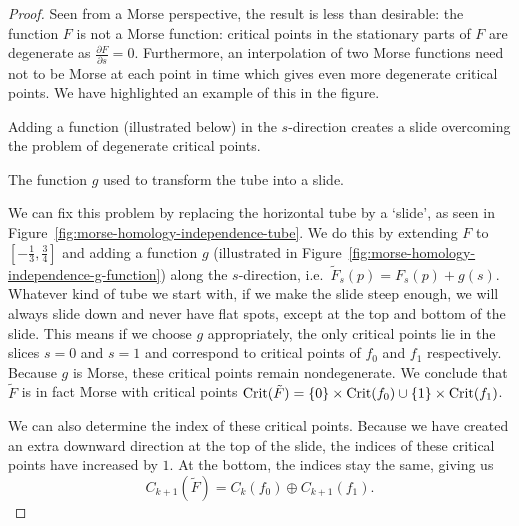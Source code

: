 \begin{proof}
Seen from a Morse perspective, the result is less than desirable: the function $F$ is not a Morse function: critical points in the stationary parts of $F$ are degenerate as $\frac{\partial F}{\partial s} = 0$.
Furthermore, an interpolation of two Morse functions need not to be Morse at each point in time which gives even more degenerate critical points. We have highlighted an example of this in the figure.

\begin{marginfigure}
    \centering
    \caption{Adding a function (illustrated below) in the $s$-direction creates a slide overcoming the problem of degenerate critical points.}
    \label{fig:morse-homology-independence-tube}
\end{marginfigure}

\begin{marginfigure}
    \centering
    \caption{The function $g$ used to transform the tube into a slide.}
    \label{fig:morse-homology-independence-g-function}
\end{marginfigure}

We can fix this problem by replacing the horizontal tube by a `slide', as seen in Figure~\ref{fig:morse-homology-independence-tube}.
We do this by extending $F$ to $\left[-\frac{1}{3}, \frac{3}{4}\right]$ and adding a function $g$ (illustrated in Figure~\ref{fig:morse-homology-independence-g-function}) along the $s$-direction, i.e.\ $\tilde{F}_s(p) = F_s(p) + g(s)$.
Whatever kind of tube we start with, if we make the slide steep enough, we will always slide down and never have flat spots, except at the top and bottom of the slide.
This means if we choose $g$ appropriately, the only critical points lie in the slices $s=0$ and  $s=1$ and correspond to critical points of $f_0$ and $f_1$ respectively.
Because $g$ is Morse, these critical points remain nondegenerate.
We conclude that $\tilde{F}$ is in fact Morse with critical points $\operatorname{Crit}(\tilde{F}) = \{0\} \times \operatorname{Crit}(f_0) \cup \{1\} \times \operatorname{Crit}(f_1)$.

We can also determine the index of these critical points.
Because we have created an extra downward direction at the top of the slide, the indices of these critical points have increased by $1$.
At the bottom, the indices stay the same, giving us
\[
    C_{k+1}(\tilde{F}) = C_k(f_0) \oplus C_{k+1}(f_1)
.\] 


\end{proof}
